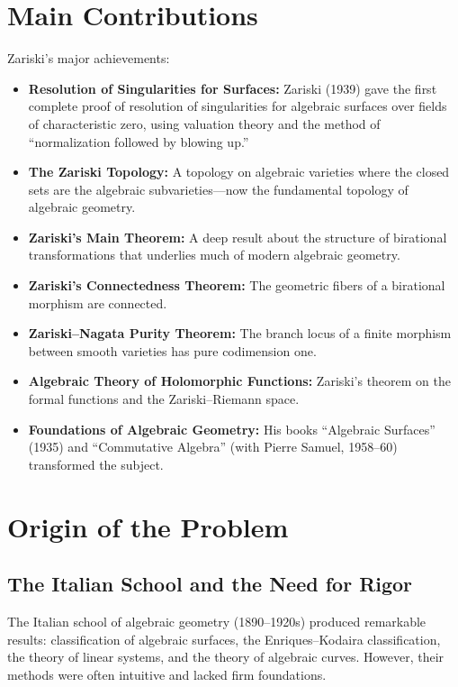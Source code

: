 \section{Main Contributions}

Zariski's major achievements:

\begin{itemize}
    \item \textbf{Resolution of Singularities for Surfaces:} Zariski (1939) gave the first complete proof of resolution of singularities for algebraic surfaces over fields of characteristic zero, using valuation theory and the method of ``normalization followed by blowing up.''
    \item \textbf{The Zariski Topology:} A topology on algebraic varieties where the closed sets are the algebraic subvarieties---now the fundamental topology of algebraic geometry.
    \item \textbf{Zariski's Main Theorem:} A deep result about the structure of birational transformations that underlies much of modern algebraic geometry.
    \item \textbf{Zariski's Connectedness Theorem:} The geometric fibers of a birational morphism are connected.
    \item \textbf{Zariski--Nagata Purity Theorem:} The branch locus of a finite morphism between smooth varieties has pure codimension one.
    \item \textbf{Algebraic Theory of Holomorphic Functions:} Zariski's theorem on the formal functions and the Zariski--Riemann space.
    \item \textbf{Foundations of Algebraic Geometry:} His books ``Algebraic Surfaces'' (1935) and ``Commutative Algebra'' (with Pierre Samuel, 1958--60) transformed the subject.
\end{itemize}

\section{Origin of the Problem}

\subsection{The Italian School and the Need for Rigor}

The Italian school of algebraic geometry (1890--1920s) produced remarkable results: classification of algebraic surfaces, the Enriques--Kodaira classification, the theory of linear systems, and the theory of algebraic curves. However, their methods were often intuitive and lacked firm foundations.

